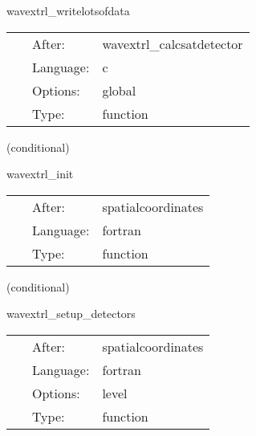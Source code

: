 \hspace{5mm} wavextrl\_writelotsofdata 

\hspace{5mm}{\it output one file per (l,m) mode, all detectors in one file } 


\hspace{5mm}

 \begin{tabular*}{160mm}{cll} 
~ & After:  & wavextrl\_calcsatdetector \\ 
~ & Language:  & c \\ 
~ & Options:  & global \\ 
~ & Type:  & function \\ 
\end{tabular*} 


\vspace{5mm}

   (conditional) 

\hspace{5mm} wavextrl\_init 

\hspace{5mm}{\it setup weights for integration } 


\hspace{5mm}

 \begin{tabular*}{160mm}{cll} 
~ & After:  & spatialcoordinates \\ 
~ & Language:  & fortran \\ 
~ & Type:  & function \\ 
\end{tabular*} 


\vspace{5mm}

   (conditional) 

\hspace{5mm} wavextrl\_setup\_detectors 

\hspace{5mm}{\it initial setup of all detectors } 


\hspace{5mm}

 \begin{tabular*}{160mm}{cll} 
~ & After:  & spatialcoordinates \\ 
~ & Language:  & fortran \\ 
~ & Options:  & level \\ 
~ & Type:  & function \\ 
\end{tabular*} 


